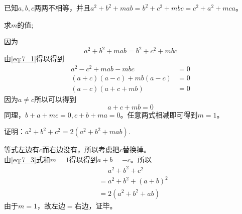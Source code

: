 \documentclass[windows,csize4,answers]{BHCexam}
\begin{document}
\begin{groups}
\begin{questions}[]
        \question[5]  已知$a,b,c$两两不相等，并且$a^2+b^2+mab=b^2+c^2+mbc=c^2+a^2+mca$。
        \begin{subquestions}
            \subquestion  求$m$的值;
            \begin{solution}{0.5cm}
                \methodonly 因为
                \begin{equation}
                    \label{eq:7_1}
                    a^2+b^2+mab=b^2+c^2+mbc
                \end{equation}
                由\ref{eq:7_1}得以得到
                \begin{equation}
                    \label{eq:7_2}
                    \begin{aligned}
                        a^2-c^2+mab-mbc&=0 \\ 
                        (a+c)(a-c)+mb(a-c)&=0 \\ 
                        (a-c)(a+c+mb)&=0
                    \end{aligned}
                \end{equation}
                因为$a\neq c$所以可以得到
                \begin{equation}
                    \label{eq:7_3}
                    a+c+mb=0   
                \end{equation}
                同理，$b+a+mc=0, c+b+ma=0$。任意两式相减即可得到$m=1$。
            \end{solution}
            \subquestion 证明：$a^2+b^2+c^2=2(a^2+b^2+mab)$.
            \begin{solution}{0.5cm}
                \methodonly 等式左边有$c$而右边没有，所以考虑把$c$替换掉。\\ 
                由\ref{eq:7_3}式和$m=1$得以得到$a+b=-c$。所以
                \begin{equation}
                    \label{eq:7_4}
                    \begin{aligned}
                    &\phantom{=}a^2+b^2+c^2  \\ 
                    &=a^2+b^2+(a+b)^2 \\ 
                    &=2(a^2+b^2+ab)
                    \end{aligned}
                \end{equation}
                由于$m=1$，故左边$=$右边，证毕。
            \end{solution}
        \end{subquestions}
        \vspace{3.5cm}



\end{questions}
\end{groups}
\end{document}
